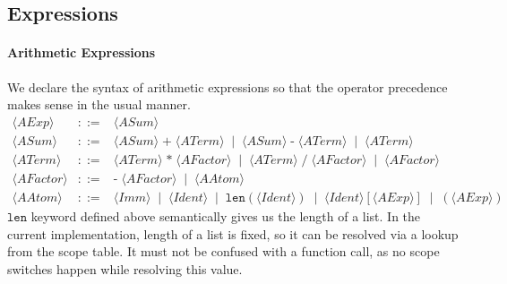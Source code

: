 \documentclass{article}
\begin{document}
\subsection{Expressions}

\paragraph{Arithmetic Expressions} 
We declare the syntax of arithmetic expressions so that the operator precedence makes sense in the usual manner.
\[
\begin{array}{rcl}
\langle \mathit{AExp} \rangle
&::=&
\langle \mathit{ASum} \rangle \\[4pt]

\langle \mathit{ASum} \rangle
&::=&
\langle \mathit{ASum} \rangle\;\texttt{+}\;\langle \mathit{ATerm} \rangle
\;\mid\;
\langle \mathit{ASum} \rangle\;\texttt{-}\;\langle \mathit{ATerm} \rangle
\;\mid\;
\langle \mathit{ATerm} \rangle \\[4pt]

\langle \mathit{ATerm} \rangle
&::=&
\langle \mathit{ATerm} \rangle\;\texttt{*}\;\langle \mathit{AFactor} \rangle
\;\mid\;
\langle \mathit{ATerm} \rangle\;\texttt{/}\;\langle \mathit{AFactor} \rangle
\;\mid\;
\langle \mathit{AFactor} \rangle \\[4pt]

\langle \mathit{AFactor} \rangle
&::=&
\texttt{-}\;\langle \mathit{AFactor} \rangle
\;\mid\;
\langle \mathit{AAtom} \rangle \\[4pt]

\langle \mathit{AAtom} \rangle
&::=&
\langle \mathit{Imm} \rangle
\;\mid\;
\langle \mathit{Ident} \rangle
\;\mid\;
\mathtt{len}(\langle \mathit{Ident} \rangle)
\;\mid\;
\langle \mathit{Ident} \rangle[\langle \mathit{AExp} \rangle]
\;\mid\;
(\langle \mathit{AExp} \rangle)
\end{array}
\]
$\mathtt{len}$ keyword defined above semantically gives us the length of a list. In the current implementation, length of a list is fixed, so it can be resolved via a lookup from the scope table. It must not be confused with a function call, as no scope switches happen while resolving this value.
\end{document}
